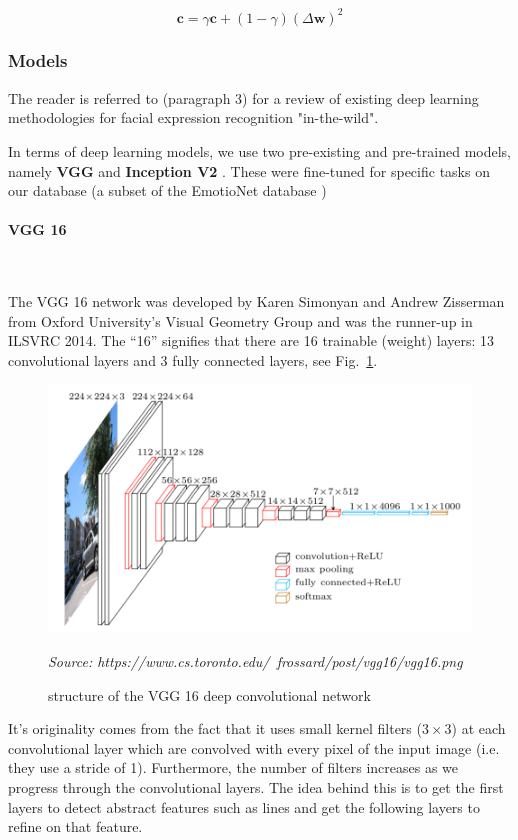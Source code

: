 \documentclass[12pt,twoside]{article}
\newcommand{\source}[1]{\vspace{-3pt} \caption*{ \footnotesize{\textit{Source: {#1}}}} }
\newcommand{\para}[1]{\paragraph{#1}\mbox{}\\}
\begin{document}
\begin{equation}
  \bm{c} = \gamma \bm{c} + (1-\gamma) \left( \Delta\bm{w} \right)^2
  \label{eq:rmsprop}
\end{equation}



\subsubsection{Models}\label{sec:models}

The reader is referred to \cite{RefWorks:2} (paragraph 3) for a review of existing deep learning methodologies for facial expression recognition "in-the-wild".

In terms of deep learning models, we use two pre-existing and pre-trained models, namely \textbf{VGG} \cite{RefWorks:22} and
\textbf{Inception V2} \cite{RefWorks:28}. These were fine-tuned for specific tasks on our
database (a subset of the EmotioNet database \cite{RefWorks:1})

\para{VGG 16}\label{para:vgg16}

The VGG 16 network was developed by Karen Simonyan and Andrew Zisserman from
Oxford University's Visual Geometry Group and was the runner-up in ILSVRC 2014. 
The ``16'' signifies that there are 16 trainable (weight) layers: 13 convolutional
layers and 3 fully connected layers, see Fig.~\ref{fig:vgg16}.

\begin{figure}[ht]
  \centering
  \includegraphics[scale=0.7]{figures/vgg16.png}
  \caption{structure of the VGG 16 deep convolutional network}
  \source{https://www.cs.toronto.edu/~frossard/post/vgg16/vgg16.png}
  \label{fig:vgg16}
\end{figure}

It's originality comes from the fact that it uses small kernel filters
($3 \times 3$) at each convolutional layer which are convolved with every
pixel of the input image (i.e. they use a stride of 1). Furthermore, 
the number of filters increases as we progress through the convolutional layers.
The idea behind this is to get the first layers to detect abstract features
such as lines and get the following layers to refine on that feature.
\end{document}

